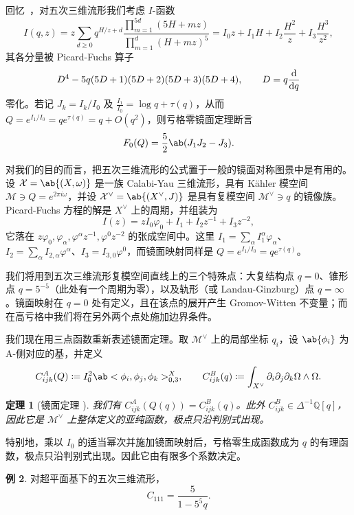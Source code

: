 \documentclass{amsart}
\newtheorem{thm}{定理}[section]
\theoremstyle{definition}
\newtheorem{exm}[thm]{例}
\theoremstyle{remark}
\theoremstyle{plain}
\theoremstyle{definition}
\theoremstyle{remark}
\newcommand{\Q}{\mathbb{Q}}
\newcommand{\mc}[1]{\mathcal{#1}}
\newcommand{\1}{\mathbf{1}}
\newcommand{\2}{\mathbf{2}}
\newcommand{\3}{\mathbf{3}}
\begin{document}
回忆~，对五次三维流形我们考虑 \(I\)-函数
\[
    I(q,z) = z\sum_{d \geq 0} q^{H/z+d} \frac{\prod_{m=1}^{5d}(5H+mz)}{\prod_{m=1}^d (H+mz)^5} = I_0 z + I_1 H + I_2 \frac{H^2}{z} + I_3 \frac{H^3}{z^2},
\]
其各分量被 Picard-Fuchs 算子
\[ D^4 - 5q(5D+1)(5D+2)(5D+3)(5D+4), \qquad D = q \odv{}{q} \]
零化。若记 \(J_k = I_k/I_0\) 及 \(\frac{I_1}{I_0} = \log q + \tau(q)\)，从而 \(Q = e^{I_1/I_0} = qe^{\tau(q)} = q + O(q^2)\)，则亏格零镜面定理断言
\[ F_0(Q) = \frac{5}{2}\ab(J_1 J_2 - J_3). \]

对我们的目的而言，把五次三维流形的公式置于一般的镜面对称图景中是有用的。设 \(\mc{X} = \ab\{(X,\omega)\}\) 是一族 Calabi-Yau 三维流形，具有 Kähler 模空间 \(\mc{M} \ni Q = e^{2\pi i \omega}\)，并设 \(\mc{X}^{\vee} = \ab\{(X^{\vee},J)\}\) 是具有复模空间 \(\mc{M}^{\vee} \ni q\) 的镜像族。Picard-Fuchs 方程的解是 \(X^{\vee}\) 上的周期，并组装为
\[ I(z) = zI_0\varphi_0 + I_1 + I_2 z^{-1} + I_3 z^{-2}, \]
它落在 \(z\varphi_0, \varphi_{\alpha}, \varphi^{\alpha}z^{-1}, \varphi^0 z^{-2}\) 的张成空间中。这里 \(I_1 = \sum_{\alpha} I_1^{\alpha}\varphi_{\alpha}\)、\(I_2 = \sum_{\alpha} I_{2,\alpha}\varphi^{\alpha}\)、\(I_3 = I_{3,0}\varphi^0\)，而镜面映射同样是 \(Q = e^{I_1/I_0} = qe^{\tau(q)}\)。

我们将用到五次三维流形复模空间直线上的三个特殊点：大复结构点 \(q=0\)、锥形点 \(q = 5^{-5}\)（此处有一个周期为零），以及轨形（或 Landau-Ginzburg）点 \(q = \infty\)。镜面映射在 \(q=0\) 处有定义，且在该点的展开产生 Gromov-Witten 不变量；而在高亏格中我们将在另外两个点处施加边界条件。

我们现在用三点函数重新表述镜面定理。取 \(\mc{M}^{\vee}\) 上的局部坐标 \(q_i\)，设 \(\ab\{\phi_i\}\) 为 A-侧对应的基，并定义
\[ C^A_{ijk}(Q) \coloneqq I_0^2 \ab<\phi_i, \phi_j, \phi_k>^X_{0,3}, \qquad C^B_{ijk}(q) \coloneqq \int_{X^{\vee}} \partial_i \partial_j \partial_k \Omega \wedge \Omega. \]

\begin{thm}[镜面定理 {\cite{Givental1998,LLY1997}}]
    我们有 \(C^A_{ijk}(Q(q)) = C^B_{ijk}(q)\)。此外 \(C^B_{ijk} \in \Delta^{-1}\Q[q]\)，因此它是 \(\mc{M}^{\vee}\) 上整体定义的亚纯函数，极点只沿判别式出现。
\end{thm}

特别地，乘以 \(I_0\) 的适当幂次并施加镜面映射后，亏格零生成函数成为 \(q\) 的有理函数，极点只沿判别式出现。因此它由有限多个系数决定。

\begin{exm}
    对超平面基下的五次三维流形，
    \[ C_{111} = \frac{5}{1-5^5 q}. \]
\end{exm}
\end{document}
